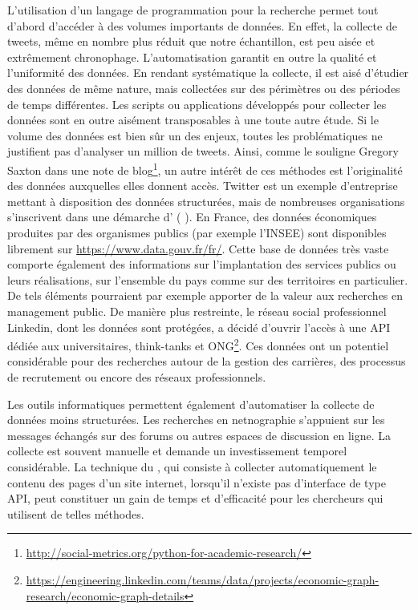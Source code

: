         L'utilisation d'un langage de programmation pour la recherche permet tout d'abord d'accéder à des volumes importants de données. En effet, la collecte de tweets, même en nombre plus réduit que notre échantillon, est peu aisée et extrêmement chronophage. L'automatisation garantit en outre la qualité et l'uniformité des données. En rendant systématique la collecte, il est aisé d'étudier des données de même nature, mais collectées sur des périmètres ou des périodes de temps différentes. Les scripts ou applications développés pour collecter les données sont en outre aisément transposables à une toute autre étude.
        Si le volume des données est bien sûr un des enjeux, toutes les problématiques ne justifient pas d'analyser un million de tweets. Ainsi, comme le souligne Gregory Saxton dans une note de blog\footnote{\url{http://social-metrics.org/python-for-academic-research/}}, un autre intérêt de ces méthodes est l'originalité des données auxquelles elles donnent accès. Twitter est un exemple d'entreprise mettant à disposition des données structurées, mais de nombreuses organisations s'inscrivent dans une démarche d' ( ). En France, des données économiques produites par des organismes publics (par exemple l'INSEE) sont disponibles librement sur \url{https://www.data.gouv.fr/fr/}. Cette base de données très vaste comporte également des informations sur l'implantation des services publics ou leurs réalisations, sur l'ensemble du pays comme sur des territoires en particulier. De tels éléments pourraient par exemple apporter de la valeur aux recherches en management public. De manière plus restreinte, le réseau social professionnel Linkedin, dont les données sont protégées, a décidé d'ouvrir l'accès à une API dédiée aux universitaires, think-tanks et ONG\footnote{\url{https://engineering.linkedin.com/teams/data/projects/economic-graph-research/economic-graph-details}}. Ces données ont un potentiel considérable pour des recherches autour de la gestion des carrières, des processus de recrutement ou encore des réseaux professionnels.

        Les outils informatiques permettent également d'automatiser la collecte de données moins structurées. Les recherches en netnographie s'appuient sur les messages échangés sur des forums ou autres espaces de discussion en ligne. La collecte est souvent manuelle et demande un investissement temporel considérable. La technique du , qui consiste à collecter automatiquement le contenu des pages d'un site internet, lorsqu'il n'existe pas d'interface de type API, peut constituer un gain de temps et d'efficacité pour les chercheurs qui utilisent de telles méthodes. \\

